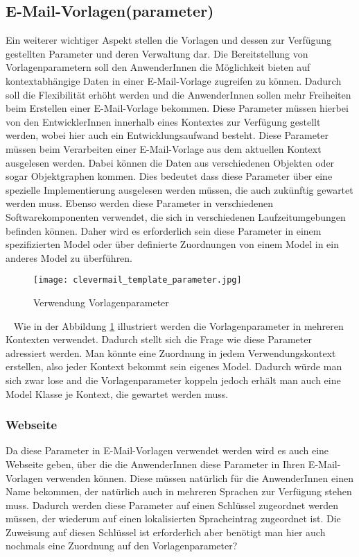 \subsection{E-Mail-Vorlagen(parameter)}
Ein weiterer wichtiger Aspekt stellen die Vorlagen und dessen zur Verfügung gestellten Parameter und deren Verwaltung dar. Die Bereitstellung von Vorlagenparametern soll den AnwenderInnen die Möglichkeit bieten auf kontextabhängige Daten in einer E-Mail-Vorlage zugreifen zu können. Dadurch soll die Flexibilität erhöht werden und die AnwenderInnen sollen mehr Freiheiten beim Erstellen einer E-Mail-Vorlage bekommen. Diese Parameter müssen hierbei von den EntwicklerInnen innerhalb eines Kontextes zur Verfügung gestellt werden, wobei hier auch ein Entwicklungsaufwand besteht. Diese Parameter müssen beim Verarbeiten einer E-Mail-Vorlage aus dem aktuellen Kontext ausgelesen werden. Dabei können die Daten aus verschiedenen Objekten oder sogar Objektgraphen kommen. Dies bedeutet dass diese Parameter über eine spezielle Implementierung ausgelesen werden müssen, die auch zukünftig gewartet werden muss. Ebenso werden diese Parameter in verschiedenen Softwarekomponenten verwendet, die sich in verschiedenen Laufzeitumgebungen befinden können. Daher wird es erforderlich sein diese Parameter in einem spezifizierten Model oder über definierte Zuordnungen von einem Model in ein anderes Model zu überführen.
\begin{figure}[h]
\centering
\texttt{[image: clevermail\_template\_parameter.jpg]}
\caption{Verwendung Vorlagenparameter}
\label{fig:clevermail-template-parameter}
\end{figure}
\ \newline
Wie in der Abbildung \ref{fig:clevermail-template-parameter} illustriert werden die Vorlagenparameter in mehreren Kontexten verwendet. Dadurch stellt sich die Frage wie diese Parameter adressiert werden. Man könnte eine Zuordnung in jedem Verwendungskontext erstellen, also jeder Kontext bekommt sein eigenes Model. Dadurch würde man sich zwar lose and die Vorlagenparameter koppeln jedoch erhält man auch eine Model Klasse je Kontext, die gewartet werden muss. 

\subsubsection{Webseite}
\label{sec:template-parameter-web-view}
Da diese Parameter in E-Mail-Vorlagen verwendet werden wird es auch eine Webseite geben, über die die AnwenderInnen diese Parameter in Ihren E-Mail-Vorlagen verwenden können. Diese müssen natürlich für die AnwenderInnen einen Name bekommen, der natürlich auch in mehreren Sprachen zur Verfügung stehen muss. Dadurch werden diese Parameter auf einen Schlüssel zugeordnet werden müssen, der wiederum auf einen lokalisierten Spracheintrag zugeordnet ist. Die Zuweisung auf diesen Schlüssel ist erforderlich aber benötigt man hier auch nochmals eine Zuordnung auf den Vorlagenparameter?

